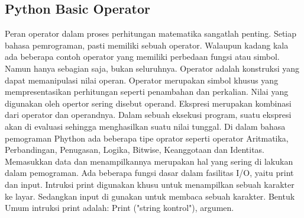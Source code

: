 \subsection{Python Basic Operator}
Peran operator dalam proses perhitungan matematika sangatlah penting.
Setiap bahasa pemrograman, pasti memiliki sebuah operator. Walaupun kadang kala ada beberapa contoh operator yang memiliki perbedaan fungsi atau simbol. Namun hanya sebagian saja, bukan seluruhnya. Operator adalah konstruksi yang dapat memanipulasi nilai operan.
Operator merupakan simbol khusus yang mempresentasikan perhitungan seperti penambahan dan perkalian. Nilai yang digunakan oleh opertor sering disebut operand. Ekspresi merupakan kombinasi dari operator dan operandnya. Dalam sebuah eksekusi program, suatu ekspresi akan di evaluasi sehingga menghasilkan suatu nilai tunggal. Di dalam bahasa pemograman Phython ada beberapa tipe oprator seperti operator Aritmatika, Perbandingan, Penugasan, Logika, Bitwise, Keanggotaan dan Identitas. Memasukkan data dan menampilkannya merupakan hal yang sering di lakukan dalam pemograman. Ada beberapa fungsi dasar dalam fasilitas I/O, yaitu print dan input. Intruksi print digunakan khusu untuk menampilkan sebuah karakter ke layar. Sedangkan input di gunakan untuk membaca sebuah karakter. Bentuk Umum intruksi print adalah: Print ("string kontrol"), argumen.

